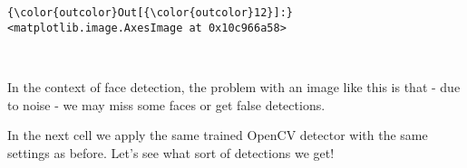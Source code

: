 \documentclass[11pt]{article}
\begin{document}
\begin{Verbatim}[commandchars=\\\{\}]
{\color{outcolor}Out[{\color{outcolor}12}]:} <matplotlib.image.AxesImage at 0x10c966a58>
\end{Verbatim}
            
    \begin{center}
    \end{center}
    { \hspace*{\fill} \\}
    
    In the context of face detection, the problem with an image like this is
that - due to noise - we may miss some faces or get false detections.

In the next cell we apply the same trained OpenCV detector with the same
settings as before. Let's see what sort of detections we get!
\end{document}
